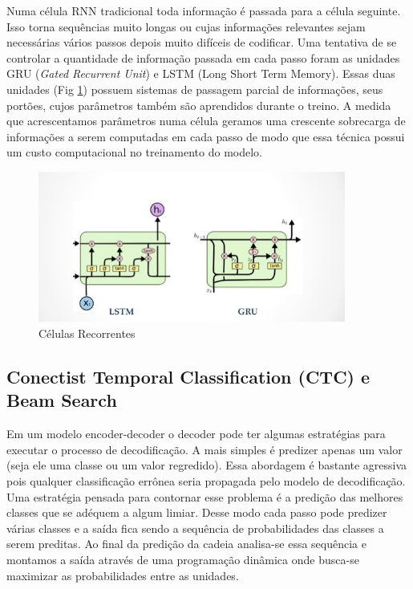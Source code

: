Numa célula RNN tradicional toda informação é passada para a célula seguinte. Isso torna sequências muito longas ou cujas informações relevantes sejam necessárias vários passos depois muito difíceis de codificar. Uma tentativa de se controlar a quantidade de informação passada em cada passo foram as unidades GRU (\textit{Gated Recurrent Unit}) e LSTM (Long Short Term Memory). Essas duas unidades (Fig \ref{fig:gated_units}) possuem sistemas de passagem parcial de informações, seus portões, cujos parâmetros também são aprendidos durante o treino. A medida que acrescentamos parâmetros numa célula geramos uma crescente sobrecarga de informações a serem computadas em cada passo de modo que essa técnica possui um custo computacional no treinamento do modelo. 

\begin{figure}[h]
    \centering
    \includegraphics[width=0.9\textwidth]{figuras/recurrent_cell.jpg}
    \caption{Células Recorrentes}
    \label{fig:gated_units}
\end{figure}


\subsection{Conectist Temporal Classification (CTC) e Beam Search}
Em um modelo encoder-decoder o decoder pode ter algumas estratégias para executar o processo de decodificação. A mais simples é predizer apenas um valor (seja ele uma classe ou um valor regredido). Essa abordagem é bastante agressiva pois qualquer classificação errônea seria propagada pelo modelo de decodificação. Uma estratégia pensada para contornar esse problema é a predição das melhores classes que se adéquem a algum limiar. Desse modo cada passo pode predizer várias classes e a saída fica sendo a sequência de probabilidades das classes a serem preditas. Ao final da predição da cadeia analisa-se essa sequência e montamos a saída através de uma programação dinâmica onde busca-se maximizar as probabilidades entre as unidades. 

